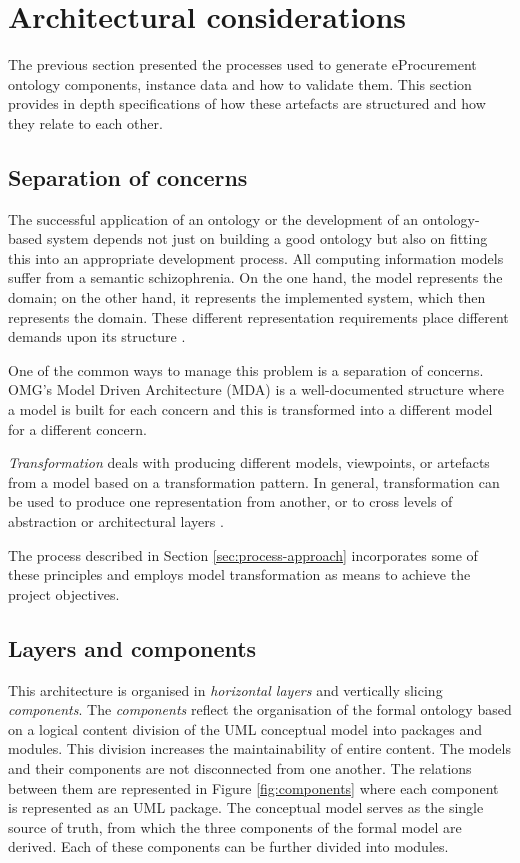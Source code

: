 \section{Architectural considerations}
\label{sec:architecture}

	The previous section presented the processes used to generate eProcurement ontology components, instance data and how to validate them. This section provides in depth specifications of how these artefacts are structured and how they relate to each other. 

	\subsection{Separation of concerns}
	\label{sec:separation-conceprns}
	
	The successful application of an ontology or the development of an ontology-based system depends not just on building a good ontology but also on fitting this into an appropriate development  process.  All computing information models suffer from a semantic schizophrenia. On the one hand, the model represents the domain; on the other hand, it represents the implemented system, which then represents the domain. These different representation requirements place different demands upon its structure \cite{partridge2013}.
	
	One of the common ways to manage this problem is a separation of concerns. OMG's Model Driven Architecture (MDA) \cite{mda-paper} is a well-documented structure where a model is built for each concern and this is transformed into a different model for a different concern. 
	
	\textit{Transformation} deals with producing different models, viewpoints, or artefacts from a model based on a transformation pattern. In general, transformation can be used to produce one representation from another, or to cross levels of abstraction or architectural layers \cite{mda-guide2}. 
	
	The process described in Section \ref{sec:process-approach} incorporates some of these principles and employs model transformation as means to achieve the project objectives.

	
	\subsection{Layers and components}
	\label{sec:layers-components}
	
	This architecture is organised in \textit{horizontal layers} and vertically slicing \textit{components}. The \textit{components} reflect the organisation of the formal ontology based on a logical content division of the UML conceptual model into packages and modules. This division increases the maintainability of entire content. The models and their components are not disconnected from one another. The relations between them are represented in Figure \ref{fig:components} where each component is represented as an UML package. The conceptual model serves as the single source of truth, from which the three components of the formal model are derived. Each of these components can be further divided into modules. 
	
